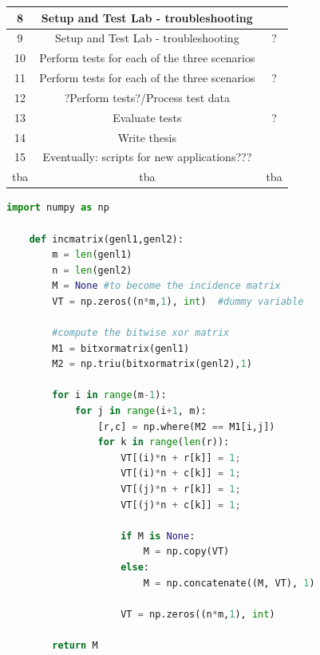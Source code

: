 \documentclass{article}
\begin{document}
\begin{center}
\begin{tabular}{ | c | c | c | }
    8  & Setup and Test Lab - troubleshooting &  \\
    \hline
    9  & Setup and Test Lab - troubleshooting & ? \\
    \hline
    10  & Perform tests for each of the three scenarios & \\
    \hline
    11  & Perform tests for each of the three scenarios & ? \\
    \hline
    12  & ?Perform tests?/Process test data & \\
    \hline
    13 & Evaluate tests & ? \\
    \hline
    14 & Write thesis & \\
    \hline
    15 & Eventually: scripts for new applications??? & \\
    \hline
    tba & tba & tba \\
    \hline

    \end{tabular}
    \end{center}

    \begin{lstlisting}[language=Python]
    import numpy as np

    def incmatrix(genl1,genl2):
        m = len(genl1)
        n = len(genl2)
        M = None #to become the incidence matrix
        VT = np.zeros((n*m,1), int)  #dummy variable

        #compute the bitwise xor matrix
        M1 = bitxormatrix(genl1)
        M2 = np.triu(bitxormatrix(genl2),1)

        for i in range(m-1):
            for j in range(i+1, m):
                [r,c] = np.where(M2 == M1[i,j])
                for k in range(len(r)):
                    VT[(i)*n + r[k]] = 1;
                    VT[(i)*n + c[k]] = 1;
                    VT[(j)*n + r[k]] = 1;
                    VT[(j)*n + c[k]] = 1;

                    if M is None:
                        M = np.copy(VT)
                    else:
                        M = np.concatenate((M, VT), 1)

                    VT = np.zeros((n*m,1), int)

        return M
    \end{lstlisting}

    
\end{document}
